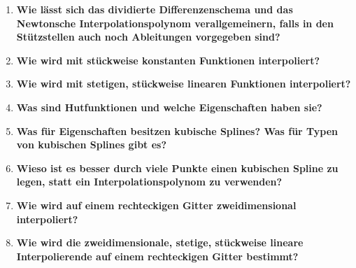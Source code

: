 \begin{enumerate}
		\item \textbf{Wie lässt sich das dividierte Differenzenschema und das Newtonsche Interpolationspolynom verallgemeinern, falls in den Stützstellen auch noch Ableitungen vorgegeben sind?} \\
		
		\item \textbf{Wie wird mit stückweise konstanten Funktionen interpoliert?} \\
		
		\item \textbf{Wie wird mit stetigen, stückweise linearen Funktionen interpoliert?} \\
		
		\item \textbf{Was sind Hutfunktionen und welche Eigenschaften haben sie?} \\
		
		\item \textbf{Was für Eigenschaften besitzen kubische Splines? Was für Typen von kubischen Splines gibt es?} \\
		
		\item \textbf{Wieso ist es besser durch viele Punkte einen kubischen Spline zu legen, statt ein Interpolationspolynom zu verwenden?} \\
		
		\item \textbf{Wie wird auf einem rechteckigen Gitter zweidimensional interpoliert?} \\
		
		\item \textbf{Wie wird die zweidimensionale, stetige, stückweise lineare Interpolierende auf einem rechteckigen Gitter bestimmt?} \\
		
	\end{enumerate}